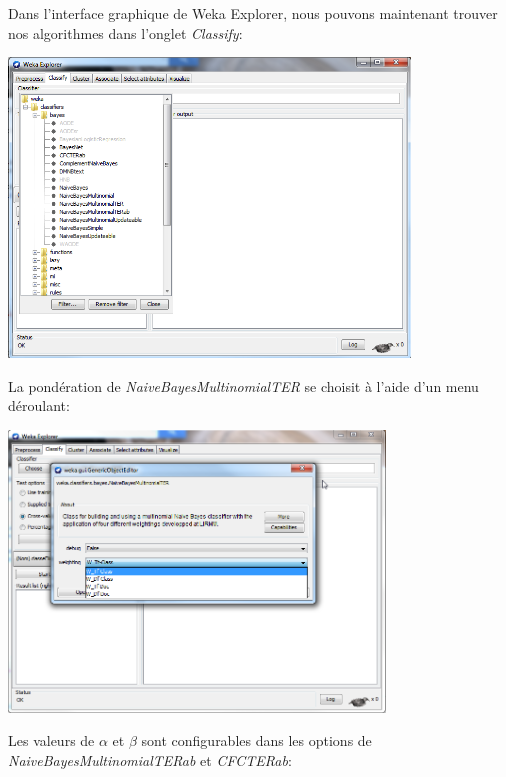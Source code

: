 \documentclass{article}
\begin{document}
Dans l'interface graphique de Weka Explorer, nous pouvons maintenant trouver nos algorithmes dans l'onglet \textit{Classify}:

\begin{center}
\includegraphics[width=0.80\textwidth]{wekaAlgos}~\\[1cm]  
\end{center}

La pondération de \textit{NaiveBayesMultinomialTER} se choisit à l'aide d'un menu déroulant:

\begin{center}
\includegraphics[width=0.75\textwidth]{wekaPond}~\\[1cm]  
\end{center}

Les valeurs de $\alpha$ et $\beta$ sont configurables dans les options de \textit{NaiveBayesMultinomialTERab} et \textit{CFCTERab}:
\end{document}
